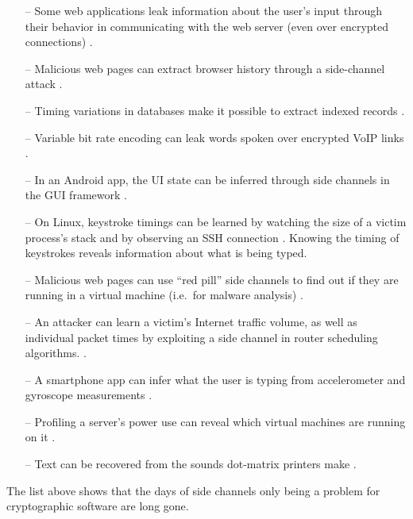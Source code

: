 \documentclass[letterpaper,twocolumn,10pt]{article}
\begin{document}
\begin{itemize}
    \item[--] Some web applications leak information about the user's input through
          their behavior in communicating with the web server (even over
          encrypted connections) \cite{bortz2007exposing, chen2010side}.
    \item[--] Malicious web pages can extract browser history through a side-channel attack
          \cite{weinberg2011still}. 
    \item[--] Timing variations in databases make it possible to extract
          indexed records \cite{futoransky2007nd2db}.
    \item[--] Variable bit rate encoding can leak words spoken over encrypted
        VoIP links \cite{white2011phonotactic}.
    \item[--] In an Android app, the UI state can be inferred through side channels
          in the GUI framework \cite{chen2014peeking}.
    \item[--] On Linux, keystroke timings can be learned by watching the size of
          a victim process's stack \cite{zhang2009peeping} and by observing an
          SSH connection \cite{song2001timing}. Knowing the timing of keystrokes
          reveals information about what is being typed.
    \item[--] Malicious web pages can use ``red pill'' side channels to find out if
          they are running in a virtual machine (i.e.\ for malware analysis)
          \cite{ho2014tick}.
    \item[--] An attacker can learn a victim's Internet traffic volume, as well as
          individual packet times by exploiting a side channel in router
          scheduling algorithms. \cite{kadloor2010low}.
    \item[--] A smartphone app can infer what the user is typing from accelerometer
          and gyroscope measurements \cite{owusu2012accessory,
          cai2012practicality}.
    \item[--] Profiling a server's power use can reveal which virtual machines
        are running on it \cite{hlavacs2011energy}.
    \item[--] Text can be recovered from the sounds dot-matrix printers make
          \cite{backes2010acoustic}.
\end{itemize}

The list above shows that the days of side channels only being a problem for
cryptographic software are long gone. 
\end{document}
